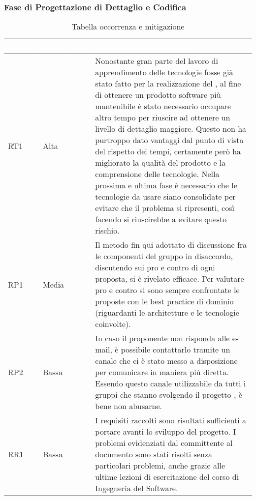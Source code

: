 \subsubsection{Fase di Progettazione di Dettaglio e Codifica}
{
\renewcommand{\arraystretch}{2}
\centering
\begin{longtable}{C{2cm} C{3cm} C{10cm}}
\caption{Tabella occorrenza e mitigazione}\\

\textcolor{white}{\textbf{Codice}} & 
\textcolor{white}{\textbf{Occorrenza}} & 
\textcolor{white}{\textbf{Descrizione e risoluzione}}\\	
\endhead

RT1 &
Alta &
Nonostante gran parte del lavoro di apprendimento delle tecnologie fosse già stato fatto per la realizzazione del , al fine di ottenere un prodotto software più mantenibile è stato necessario occupare altro tempo per riuscire ad ottenere un livello di dettaglio maggiore. Questo non ha purtroppo dato vantaggi dal punto di vista del rispetto dei tempi, certamente però ha migliorato la qualità del prodotto e la comprensione delle tecnologie. Nella prossima e ultima fase è necessario che le tecnologie da usare siano consolidate per evitare che il problema si ripresenti, così facendo si riuscirebbe a evitare questo rischio. \\

RP1 &
Media &
Il metodo fin qui adottato di discussione fra le componenti del gruppo in disaccordo, discutendo sui pro e contro di ogni proposta, si è rivelato efficace. Per valutare pro e contro si sono sempre confrontate le proposte con le best practice di dominio (riguardanti le architetture e le tecnologie coinvolte). \\

RP2 &
Bassa &
In caso il proponente non risponda alle e-mail, è possibile contattarlo tramite un canale  che ci è stato messo a disposizione per comunicare in maniera più diretta. Essendo questo canale utilizzabile da tutti i gruppi che stanno svolgendo il progetto \NomeProgetto{}, è bene non abusarne. \\

RR1 &
Bassa &
I requisiti raccolti sono risultati sufficienti a portare avanti lo sviluppo del progetto. I problemi evidenziati dal committente al documento \AdR{} sono stati risolti senza particolari problemi, anche grazie alle ultime lezioni di esercitazione del corso di Ingegneria del Software. \\


\end{longtable}}
